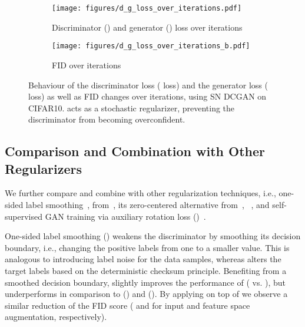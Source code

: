 \documentclass{article}
\begin{document}
\begin{figure}
	\centering
	\vspace{0em}
		\begin{minipage}{\textwidth}
	\begin{subfigure}{\textwidth}
		\centering
		\texttt{[image: figures/d\_g\_loss\_over\_iterations.pdf]}
		\caption{Discriminator () and generator () loss over iterations}\label{fig:fig_dg_loss}
	\end{subfigure}
	\end{minipage}
\begin{minipage}{.5\textwidth}
\begin{subfigure}{\textwidth}	
		\vspace{0.5em}
		\centering
		\texttt{[image: figures/d\_g\_loss\_over\_iterations\_b.pdf]}
		\caption{FID over iterations}\label{fig:fig_fid}
	\end{subfigure}
	\end{minipage}
	\hspace{.6em}
	\begin{minipage}{.45\textwidth}
\caption{\label{fig:toy_d_g_fid_loss} Behaviour of the discriminator loss ( loss) and the generator loss ( loss) as well as FID changes over iterations, using SN DCGAN on CIFAR10.  acts as a stochastic regularizer, preventing the discriminator from becoming overconfident.}
	\end{minipage}	
\end{figure}





\subsection{\label{subsec:Exp-Regulariz}Comparison and Combination with Other Regularizers}
We further compare and combine  with other regularization techniques, i.e., one-sided label smoothing~\cite{SalimansNIPS2016},  from~\cite{gulrajani_NIPS2017}, its zero-centered alternative  from~\cite{Roth_NIPS2017}, ~\cite{JMLR:v15:srivastava14a}, and self-supervised GAN training via auxiliary rotation loss ()~\cite{ChenSS2019}. 

One-sided label smoothing () weakens the discriminator by smoothing its decision boundary, i.e., changing the positive labels from one to a smaller value. This is analogous to introducing label noise for the data samples, whereas  alters the target labels based on the deterministic checksum principle. Benefiting from a smoothed decision boundary,  slightly improves the performance of  ( vs. ), but underperforms in comparison to  () and  (). By applying  on top of  we observe a similar reduction of the FID score ( and  for input and feature space augmentation, respectively).
\end{document}
